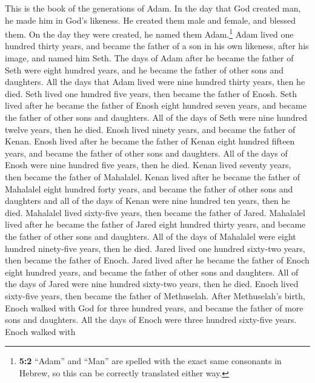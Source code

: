  This is the book of the generations of Adam. In the day
that God created man, he made him in God's likeness.  He
created them male and female, and blessed them. On the day they were
created, he named them Adam.\footnote{\textbf{5:2} ``Adam'' and ``Man''
  are spelled with the exact same consonants in Hebrew, so this can be
  correctly translated either way.}  Adam lived one
hundred thirty years, and became the father of a son in his own
likeness, after his image, and named him Seth.  The days
of Adam after he became the father of Seth were eight hundred years, and
he became the father of other sons and daughters.  All the
days that Adam lived were nine hundred thirty years, then he died.
 Seth lived one hundred five years, then became the father
of Enosh.  Seth lived after he became the father of Enosh
eight hundred seven years, and became the father of other sons and
daughters.  All of the days of Seth were nine hundred
twelve years, then he died.  Enosh lived ninety years, and
became the father of Kenan.  Enosh lived after he became
the father of Kenan eight hundred fifteen years, and became the father
of other sons and daughters.  All of the days of Enosh
were nine hundred five years, then he died.  Kenan lived
seventy years, then became the father of Mahalalel. 
Kenan lived after he became the father of Mahalalel eight hundred forty
years, and became the father of other sons and daughters 
and all of the days of Kenan were nine hundred ten years, then he died.
 Mahalalel lived sixty-five years, then became the father
of Jared.  Mahalalel lived after he became the father of
Jared eight hundred thirty years, and became the father of other sons
and daughters.  All of the days of Mahalalel were eight
hundred ninety-five years, then he died.  Jared lived one
hundred sixty-two years, then became the father of Enoch.
 Jared lived after he became the father of Enoch eight
hundred years, and became the father of other sons and daughters.
 All of the days of Jared were nine hundred sixty-two
years, then he died.  Enoch lived sixty-five years, then
became the father of Methuselah.  After Methuselah's
birth, Enoch walked with God for three hundred years, and became the
father of more sons and daughters.  All the days of Enoch
were three hundred sixty-five years.  Enoch walked with
